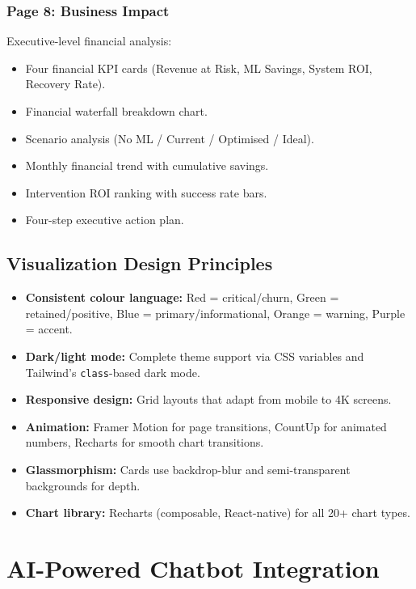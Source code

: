 \documentclass[12pt, a4paper]{report}
\begin{document}
\subsection{Page 8: Business Impact}

Executive-level financial analysis:
\begin{itemize}
    \item Four financial KPI cards (Revenue at Risk, ML Savings, System ROI, Recovery Rate).
    \item Financial waterfall breakdown chart.
    \item Scenario analysis (No ML / Current / Optimised / Ideal).
    \item Monthly financial trend with cumulative savings.
    \item Intervention ROI ranking with success rate bars.
    \item Four-step executive action plan.
\end{itemize}

\section{Visualization Design Principles}

\begin{itemize}
    \item \textbf{Consistent colour language:} Red = critical/churn, Green = retained/positive, Blue = primary/informational, Orange = warning, Purple = accent.
    \item \textbf{Dark/light mode:} Complete theme support via CSS variables and Tailwind's \texttt{class}-based dark mode.
    \item \textbf{Responsive design:} Grid layouts that adapt from mobile to 4K screens.
    \item \textbf{Animation:} Framer Motion for page transitions, CountUp for animated numbers, Recharts for smooth chart transitions.
    \item \textbf{Glassmorphism:} Cards use backdrop-blur and semi-transparent backgrounds for depth.
    \item \textbf{Chart library:} Recharts (composable, React-native) for all 20+ chart types.
\end{itemize}


\chapter{AI-Powered Chatbot Integration}
\end{document}
